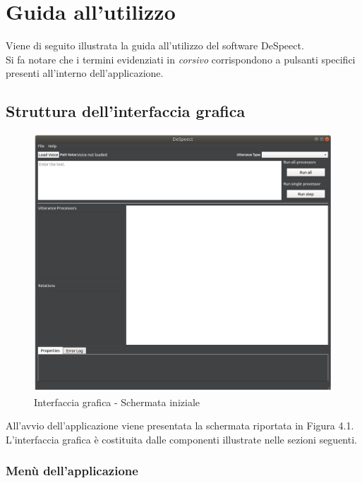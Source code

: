 \documentclass[openany,12pt,a4paper]{report}
\begin{document}
	\chapter{Guida all'utilizzo}
	Viene di seguito illustrata la guida all'utilizzo del software DeSpeect. \\
	Si fa notare che i termini evidenziati in \textit{corsivo} corrispondono a pulsanti specifici presenti all'interno dell'applicazione.
	
	\section{Struttura dell'interfaccia grafica}
	
	\begin{figure}[H]
		
		\centering
		
		\includegraphics[scale=0.3]{./img/main-window}
		
		\caption{Interfaccia grafica - Schermata iniziale}
	
	\end{figure}

	All'avvio dell'applicazione viene presentata la schermata riportata in Figura 4.1. L'interfaccia grafica è costituita dalle componenti illustrate nelle sezioni seguenti.
 	
 	\subsection{Menù dell'applicazione}
 	
\end{document}
